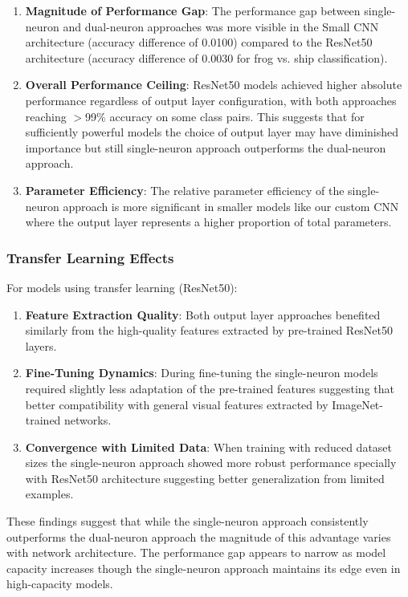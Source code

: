 \begin{enumerate}
\item \textbf{Magnitude of Performance Gap}: The performance gap between single-neuron and dual-neuron approaches was more visible in the Small CNN architecture (accuracy difference of 0.0100) compared to the ResNet50 architecture (accuracy difference of 0.0030 for frog vs. ship classification).

\item \textbf{Overall Performance Ceiling}: ResNet50 models achieved higher absolute performance regardless of output layer configuration, with both approaches reaching $>$99\% accuracy on some class pairs. This suggests that for sufficiently powerful models the choice of output layer may have diminished importance but still single-neuron approach outperforms the dual-neuron approach.

\item \textbf{Parameter Efficiency}: The relative parameter efficiency of the single-neuron approach is more significant in smaller models like our custom CNN where the output layer represents a higher proportion of total parameters.
\end{enumerate}

\subsubsection{Transfer Learning Effects}

For models using transfer learning (ResNet50):

\begin{enumerate}
\item \textbf{Feature Extraction Quality}: Both output layer approaches benefited similarly from the high-quality features extracted by pre-trained ResNet50 layers.

\item \textbf{Fine-Tuning Dynamics}: During fine-tuning the single-neuron models required slightly less adaptation of the pre-trained features suggesting that better compatibility with general visual features extracted by ImageNet-trained networks.

\item \textbf{Convergence with Limited Data}: When training with reduced dataset sizes the single-neuron approach showed more robust performance specially with ResNet50 architecture suggesting better generalization from limited examples.
\end{enumerate}

These findings suggest that while the single-neuron approach consistently outperforms the dual-neuron approach the magnitude of this advantage varies with network architecture. The performance gap appears to narrow as model capacity increases though the single-neuron approach maintains its edge even in high-capacity models.
